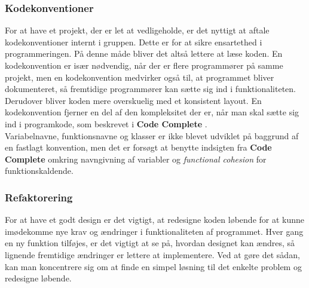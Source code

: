 \documentclass[]{article}
\begin{document}
\subsubsection{Kodekonventioner}
\noindent For at have et projekt, der er let at vedligeholde, er det nyttigt at aftale kodekonventioner internt i gruppen. Dette er for at sikre ensartethed i programmeringen. På denne måde bliver det altså lettere at læse koden. En kodekonvention er især nødvendig, når der er flere programmører på samme projekt, men en kodekonvention medvirker også til, at programmet bliver dokumenteret, så fremtidige programmører kan sætte sig ind i funktionaliteten. Derudover bliver koden mere overskuelig med et konsistent layout. En kodekonvention fjerner en del af den kompleksitet der er, når man skal sætte sig ind i programkode, som beskrevet i \textbf{Code Complete} \cite{mcconnell2004code}. \\
Variabelnavne, funktionsnavne og klasser er ikke blevet udviklet på baggrund af en fastlagt konvention, men det er forsøgt at benytte indsigten fra \textbf{Code Complete} \cite{mcconnell2004code} omkring navngivning af variabler og \textit{functional cohesion} for funktionskaldende.

\subsubsection{Refaktorering}
\noindent For at have et godt design er det vigtigt, at redesigne koden løbende for at kunne imødekomme nye krav og ændringer i funktionaliteten af programmet. Hver gang en ny funktion tilføjes, er det vigtigt at se på, hvordan designet kan ændres, så lignende fremtidige ændringer er lettere at implementere. Ved at gøre det sådan, kan man koncentrere sig om at finde en simpel løsning til det enkelte problem og redesigne løbende.
\end{document}
